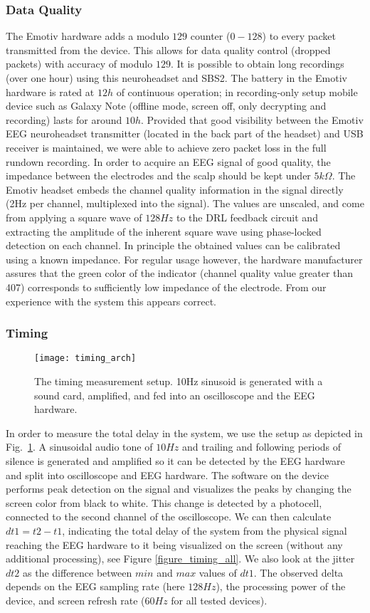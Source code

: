 \documentclass[10pt]{article}
\begin{document}
\subsubsection{Data Quality}
The Emotiv hardware adds a modulo $129$ counter ($0-128$) to every packet transmitted from the device. This allows for data quality control (dropped packets) with accuracy of modulo $129$. It is possible to obtain long recordings (over one hour) using this neuroheadset and SBS2. The battery in the Emotiv hardware is rated at $12h$ of continuous operation; in recording-only setup mobile device such as Galaxy Note (offline mode, screen off, only decrypting and recording) lasts for around $10h$. Provided that good visibility between the Emotiv EEG neuroheadset transmitter (located in the back part of the headset) and USB receiver is maintained, we were able  to achieve zero packet loss in the full rundown recording.
In order to acquire an EEG signal of good quality, the impedance between the electrodes and the scalp should be kept under $5 k\Omega$. The Emotiv headset embeds the channel quality information in the signal directly (2Hz per channel, multiplexed into the signal). The values are unscaled, and come from applying a square wave of $128Hz$ to the DRL feedback circuit and extracting the amplitude of the inherent square wave using phase-locked detection on each channel. In principle the obtained values can be calibrated using a known impedance. For regular usage however, the hardware manufacturer assures that the green color of the indicator (channel quality value greater than 407) corresponds to sufficiently low impedance of the electrode. From our experience with the system this appears correct.
		\subsubsection{Timing}
\begin{figure}[!t]
\centering
\texttt{[image: timing\_arch]}
\caption{The timing measurement setup. 10Hz sinusoid is generated with a sound card, amplified, and fed into an oscilloscope and the EEG hardware.}
\label{figure_timing_arch}
\end{figure}
In order to measure the total delay in the system, we use the setup as depicted in Fig.~\ref{figure_timing_arch}. A sinusoidal audio tone of $10Hz$ and trailing and following periods of silence is generated and amplified so it can be detected by the EEG hardware and split into oscilloscope and EEG hardware. The software on the device performs peak detection on the signal and visualizes the peaks by changing the screen color from black to white. This change is detected by a photocell, connected to the second channel of the oscilloscope. We can then calculate $dt1=t2-t1$, indicating the total delay of the system from the physical signal reaching the EEG hardware to it being visualized on the screen (without any additional processing), see Figure \ref{figure_timing_all}. We also look at the jitter $dt2$ as the difference between $min$ and $max$ values of $dt1$. The observed delta depends on the EEG sampling rate (here $128Hz$), the processing power of the device, and screen refresh rate ($60Hz$ for all tested devices).
\end{document}
